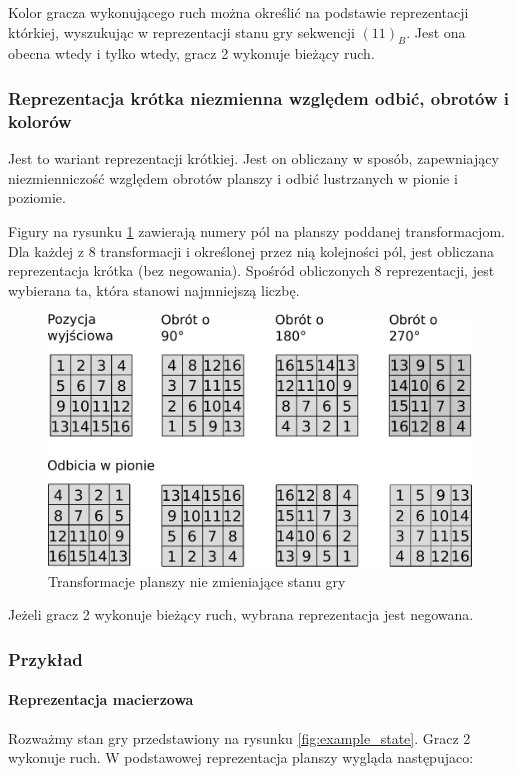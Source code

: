 \documentclass{scrartcl}
\begin{document}
Kolor gracza wykonującego ruch można określić na podstawie
reprezentacji którkiej, wyszukując w
reprezentacji stanu gry sekwencji $(11)_B$. Jest ona obecna wtedy i
tylko wtedy, gracz 2 wykonuje bieżący ruch.

\subsubsection{Reprezentacja krótka niezmienna względem odbić,
  obrotów i kolorów}
Jest to wariant reprezentacji krótkiej. Jest on obliczany w sposób,
zapewniający 
niezmienniczość względem obrotów planszy i odbić lustrzanych w pionie
i poziomie. 

Figury na rysunku \ref{fig:field_order2} zawierają numery pól na
planszy poddanej transformacjom. Dla każdej z 8 transformacji i
określonej przez nią kolejności pól, jest obliczana reprezentacja 
krótka (bez negowania). Spośród obliczonych 8 reprezentacji, 
jest wybierana ta, która stanowi najmniejszą liczbę.

\begin{figure}[h]
  \centering
  \includegraphics[width=\textwidth]{data/field_order2.pdf}
  \caption{Transformacje planszy nie zmieniające stanu gry}
  \label{fig:field_order2}
\end{figure}

Jeżeli gracz 2 wykonuje bieżący ruch, wybrana reprezentacja jest
negowana.

\subsubsection{Przykład}

\paragraph{Reprezentacja macierzowa} Rozważmy stan gry przedstawiony na rysunku \ref{fig:example_state}.
Gracz 2 wykonuje ruch. W podstawowej reprezentacja planszy wygląda
następujaco:
\end{document}
